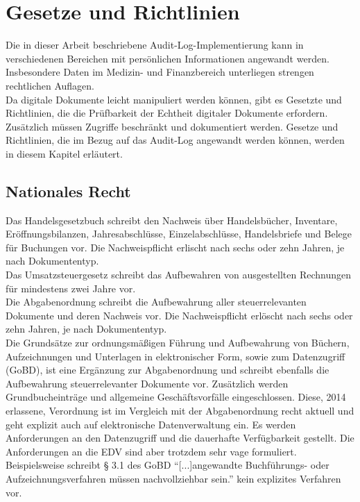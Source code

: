 \chapter{Gesetze und Richtlinien}
Die in dieser Arbeit beschriebene Audit-Log-Implementierung kann in verschiedenen Bereichen mit persönlichen Informationen angewandt werden. Insbesondere Daten im Medizin- und Finanzbereich unterliegen strengen rechtlichen Auflagen.\\
Da digitale Dokumente leicht manipuliert werden können, gibt es Gesetzte und Richtlinien, die die Prüfbarkeit der Echtheit digitaler Dokumente erfordern. Zusätzlich müssen Zugriffe beschränkt und dokumentiert werden. Gesetze und Richtlinien, die im Bezug auf das Audit-Log angewandt werden können, werden in diesem Kapitel erläutert. \cite{1966944}

\section{Nationales Recht}
Das Handelsgesetzbuch schreibt den Nachweis über Handelsbücher, Inventare, Eröffnungsbilanzen, Jahresabschlüsse, Einzelabschlüsse, Handelsbriefe und Belege für Buchungen vor. Die Nachweispflicht erlischt nach sechs oder zehn Jahren, je nach Dokumententyp.\cite{11}\\
Das Umsatzsteuergesetz schreibt das Aufbewahren von ausgestellten Rechnungen für mindestens zwei Jahre vor.\cite{12}\\
Die Abgabenordnung schreibt die Aufbewahrung aller steuerrelevanten Dokumente und deren Nachweis vor. Die Nachweispflicht erlöscht nach sechs oder zehn Jahren, je nach Dokumententyp.\cite{13}\\
Die Grundsätze zur ordnungsmäßigen Führung und Aufbewahrung von Büchern, Aufzeichnungen und Unterlagen in elektronischer Form, sowie zum Datenzugriff (\acs{GoBD}), ist eine Ergänzung zur Abgabenordnung und schreibt ebenfalls die Aufbewahrung steuerrelevanter Dokumente vor. Zusätzlich werden  Grundbucheinträge und allgemeine Geschäftsvorfälle eingeschlossen. Diese, 2014 erlassene, Verordnung ist im Vergleich mit der Abgabenordnung recht aktuell und geht explizit auch auf elektronische Datenverwaltung ein. Es werden Anforderungen an den Datenzugriff und die dauerhafte Verfügbarkeit gestellt. Die Anforderungen an die \acs{EDV} sind aber trotzdem sehr vage formuliert. Beispielsweise schreibt § 3.1 des \acs{GoBD} "`[...]angewandte Buchführungs- oder Aufzeichnungsverfahren müssen nachvollziehbar sein."'\cite{141} kein explizites Verfahren vor.\cite{14}

